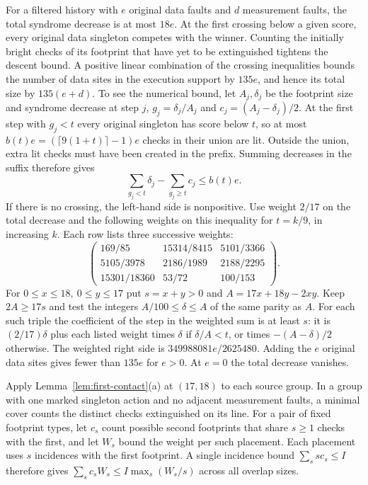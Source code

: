 \documentclass[10pt,twocolumn]{article}
\theoremstyle{definition}
\begin{document}
For a filtered history with $e$ original data faults and $d$ measurement
faults, the total syndrome decrease is at most $18e$. At the first
crossing below a given score, every original data singleton competes
with the winner. Counting the initially bright checks of its footprint
that have yet to be extinguished tightens the descent bound. A positive
linear combination of the crossing inequalities bounds the number of
data sites in the execution support by $135e$, and hence its total size
by $135(e+d)$. To see the numerical bound, let $A_j,\delta_j$ be the
footprint size and syndrome decrease at step $j$, $g_j=\delta_j/A_j$
and $c_j=(A_j-\delta_j)/2$. At the first step with $g_j<t$ every
original singleton has score below $t$, so at most
$b(t)e=(\lceil9(1+t)\rceil-1)e$ checks in their union are lit.
Outside the union, extra lit checks must have been created in the
prefix. Summing decreases in the suffix therefore gives
\[
 \sum_{g_j<t}\delta_j-\sum_{g_j\ge t}c_j\le b(t)e .
\]
If there is no crossing, the left-hand side is nonpositive.
Use weight $2/17$ on the total decrease and the following weights
on this inequality for $t=k/9$, in increasing $k$. Each row lists
three successive weights:
\[
\begin{pmatrix}
169/85&15314/8415&5101/3366\\
5105/3978&2186/1989&2188/2295\\
15301/18360&53/72&100/153
\end{pmatrix}.
\]
For $0\le x\le18,\ 0\le y\le17$ put $s=x+y>0$ and
$A=17x+18y-2xy$. Keep $2A\ge17s$ and test the integers
$A/100\le\delta\le A$ of the same parity as $A$.
For each such triple the coefficient of the step in the weighted
sum is at least $s$: it is $(2/17)\delta$ plus each listed weight
times $\delta$ if $\delta/A<t$, or times $-(A-\delta)/2$ otherwise.
The weighted right side is $349988081e/2625480$.
Adding the $e$ original data sites gives fewer than $135e$ for $e>0$.
At $e=0$ the total decrease vanishes.

Apply Lemma~\ref{lem:first-contact}(a) at $(17,18)$ to each source group. In a group
with one marked singleton action and no adjacent measurement faults,
a minimal cover counts the distinct checks extinguished on its line. For a pair of
fixed footprint types, let $c_s$ count possible second footprints that
share $s\ge1$ checks with the first, and let $W_s$ bound the weight
per such placement. Each placement uses $s$ incidences with the first
footprint. A single incidence bound $\sum_s s c_s\le I$ therefore gives
$\sum_s c_s W_s\le I\max_s(W_s/s)$ across all overlap sizes.
\end{document}
